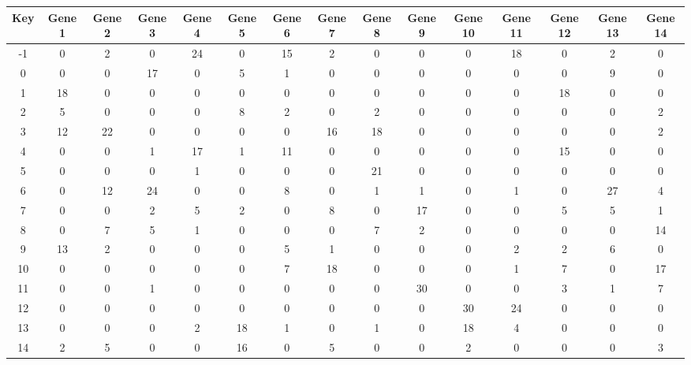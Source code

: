 \begin{tabular}{|c|c|c|c|c|c|c|c|c|c|c|c|c|c|c|}
\hline
Key & Gene 1 & Gene 2 & Gene 3 & Gene 4 & Gene 5 & Gene 6 & Gene 7 & Gene 8 & Gene 9 & Gene 10 & Gene 11 & Gene 12 & Gene 13 & Gene 14 \\
\hline
-1 & 0 & 2 & 0 & 24 & 0 & 15 & 2 & 0 & 0 & 0 & 18 & 0 & 2 & 0 \\
0 & 0 & 0 & 17 & 0 & 5 & 1 & 0 & 0 & 0 & 0 & 0 & 0 & 9 & 0 \\
1 & 18 & 0 & 0 & 0 & 0 & 0 & 0 & 0 & 0 & 0 & 0 & 18 & 0 & 0 \\
2 & 5 & 0 & 0 & 0 & 8 & 2 & 0 & 2 & 0 & 0 & 0 & 0 & 0 & 2 \\
3 & 12 & 22 & 0 & 0 & 0 & 0 & 16 & 18 & 0 & 0 & 0 & 0 & 0 & 2 \\
4 & 0 & 0 & 1 & 17 & 1 & 11 & 0 & 0 & 0 & 0 & 0 & 15 & 0 & 0 \\
5 & 0 & 0 & 0 & 1 & 0 & 0 & 0 & 21 & 0 & 0 & 0 & 0 & 0 & 0 \\
6 & 0 & 12 & 24 & 0 & 0 & 8 & 0 & 1 & 1 & 0 & 1 & 0 & 27 & 4 \\
7 & 0 & 0 & 2 & 5 & 2 & 0 & 8 & 0 & 17 & 0 & 0 & 5 & 5 & 1 \\
8 & 0 & 7 & 5 & 1 & 0 & 0 & 0 & 7 & 2 & 0 & 0 & 0 & 0 & 14 \\
9 & 13 & 2 & 0 & 0 & 0 & 5 & 1 & 0 & 0 & 0 & 2 & 2 & 6 & 0 \\
10 & 0 & 0 & 0 & 0 & 0 & 7 & 18 & 0 & 0 & 0 & 1 & 7 & 0 & 17 \\
11 & 0 & 0 & 1 & 0 & 0 & 0 & 0 & 0 & 30 & 0 & 0 & 3 & 1 & 7 \\
12 & 0 & 0 & 0 & 0 & 0 & 0 & 0 & 0 & 0 & 30 & 24 & 0 & 0 & 0 \\
13 & 0 & 0 & 0 & 2 & 18 & 1 & 0 & 1 & 0 & 18 & 4 & 0 & 0 & 0 \\
14 & 2 & 5 & 0 & 0 & 16 & 0 & 5 & 0 & 0 & 2 & 0 & 0 & 0 & 3 \\
\hline
\end{tabular}